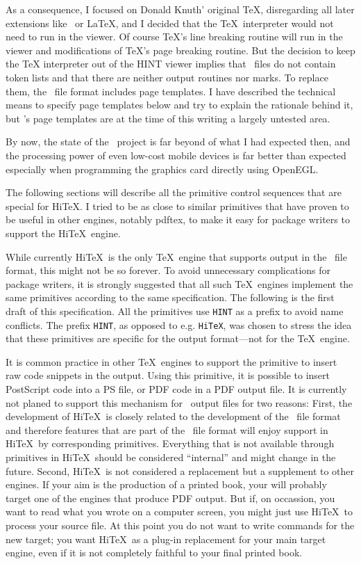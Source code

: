 As a consequence, I focused on Donald Knuth' original \TeX,
disregarding all later extensions like \eTeX\ or \LaTeX, and I
decided that the \TeX\ interpreter would not need to run in the
viewer.
Of course \TeX's line breaking routine will run in the viewer
and modifications of \TeX's page breaking routine. 
But the decision to keep the TeX interpreter
out of the HINT viewer implies that \HINT\ files do
not contain token lists and that there are
neither output routines nor marks.
To replace them, the \HINT\ file format includes
page templates. I have described the technical
means to specify page templates below and try to explain
the rationale behind it, but \HINT's page templates 
are at the time of this writing a largely untested area.

By now, the state of the \HINT\ project is far beyond of what
I had expected then, and the processing power of even low-cost
mobile devices is far better than expected especially when programming the
graphics card directly using OpenEGL.

The following sections will describe all the primitive control sequences
that are special for Hi\TeX. I tried to be as close to similar primitives
that have proven to be useful in other engines, notably pdftex, to make
it easy for package writers to support the Hi\TeX\ engine.

While currently Hi\TeX\ is the only \TeX\ engine that supports output in the \HINT\ file
format, this might not be so forever. To avoid unnecessary complications for 
package writers, it is strongly suggested that all such \TeX\ engines implement
the same primitives according to the same specification. The following is the first
draft of this specification. All the primitives use {\tt HINT} as a prefix to
avoid name conflicts. The prefix {\tt HINT}, as opposed to e.g. {\tt HiTeX},
was chosen to stress the idea that these primitives are specific for the
output format---not for the \TeX\ engine. 

It is common practice in other \TeX\ engines to support the  
primitive to insert raw code snippets in the output. Using this primitive,
it is possible to insert PostScript code into a PS file, or PDF code in a 
PDF output file. It is currently not planed to support this mechanism for
\HINT\ output files for two reasons: 
First, the development of Hi\TeX\ is closely related to the development of
the \HINT\ file format and therefore features that are part of the \HINT\
file format will enjoy support in Hi\TeX\ by corresponding primitives.
Everything that is not available through primitives in Hi\TeX\ should
be considered ``internal'' and might change in the future.
Second, Hi\TeX\ is not considered a replacement but 
a supplement to other engines. If your aim is the production of a printed
book, your will probably target one of the engines that produce PDF output.
But if, on occassion, you want to read what you wrote on a computer screen,
you might just use Hi\TeX\ to process your source file. At this point you
do not want to write \ctl{special} commands for the new target; you want
Hi\TeX\ as a plug-in replacement for your main target engine, even if it
is not completely faithful to your final printed book.  

